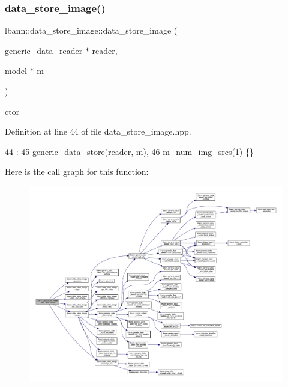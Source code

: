 \subsubsection{\texorpdfstring{data\+\_\+store\+\_\+image()}{data\_store\_image()}\hspace{0.1cm}{\footnotesize\ttfamily [1/2]}}
{\footnotesize\ttfamily lbann\+::data\+\_\+store\+\_\+image\+::data\+\_\+store\+\_\+image (\begin{DoxyParamCaption}\item[{\hyperlink{classlbann_1_1generic__data__reader}{generic\+\_\+data\+\_\+reader} $\ast$}]{reader,  }\item[{\hyperlink{classlbann_1_1model}{model} $\ast$}]{m }\end{DoxyParamCaption})\hspace{0.3cm}{\ttfamily [inline]}}



ctor 



Definition at line 44 of file data\+\_\+store\+\_\+image.\+hpp.


\begin{DoxyCode}
44                                                           :
45     \hyperlink{classlbann_1_1generic__data__store_acbcd88161c06f4bb9a70bbae857d4ee0}{generic\_data\_store}(reader, m),
46     \hyperlink{classlbann_1_1data__store__image_a2f660053e7621a9cc70a7c4eef53c9cc}{m\_num\_img\_srcs}(1) \{\}
\end{DoxyCode}
Here is the call graph for this function\+:\nopagebreak
\begin{figure}[H]
\begin{center}
\leavevmode
\includegraphics[width=350pt]{classlbann_1_1data__store__image_a8fd8c5546f405a964511823aed8ac986_cgraph}
\end{center}
\end{figure}
\mbox{\label{classlbann_1_1data__store__image_a12a813dca36d7faf2e3b36635faf2aab}} 
